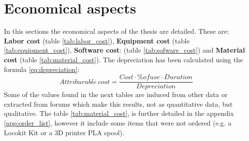 \chapter{Economical aspects} %
\label{cha:economical_aspects}
In this sections the economical aspects of the thesis are detailed.
These are: \textbf{Labor cost} (table \ref{tab:labor_cost}), \textbf{Equipment cost} (table \ref{tab:equipment_cost}), \textbf{Software cost}: (table \ref{tab:sofware_cost}) and \textbf{Material cost} (table \ref{tab:material_cost}).
The depreciation has been calculated using the formula \ref{eq:depreciation}:
\begin{equation}
  \label{eq:depreciation}
  Attriburable\ cost  = \frac{Cost \cdot \% of use \cdot Duration}{Depreciation}
\end{equation}
Some of the values found in the next tables are induced from other data or extracted from forums which make this results, not as quantitative data, but qualitative.
The table \ref{tab:material_cost}, is further detailed in the appendix \ref{app:order_list}, however it include some items that were not ordered (e.g. a Locokit Kit or a 3D printer PLA spool).

\begin{table}[htbp]
\caption{Labor cost}
\label{tab:labor_cost}
\end{table}


